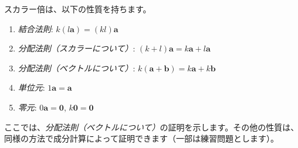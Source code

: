 \begin{thm}[スカラー倍の性質] \label{vector_scalar_property}
スカラー倍は、以下の性質を持ちます。
\begin{enumerate}
\item \emph{結合法則}: $k(l\bm{a}) = (kl)\bm{a}$
\item \emph{分配法則（スカラーについて）}: $(k+l)\bm{a} = k\bm{a} + l\bm{a}$
\item \emph{分配法則（ベクトルについて）}: $k(\bm{a}+\bm{b}) = k\bm{a} + k\bm{b}$
\item \emph{単位元}: $1\bm{a} = \bm{a}$
\item \emph{零元}: $0\bm{a} = \bm{0}$, $k\bm{0} = \bm{0}$
\end{enumerate}
\begin{proof*}
ここでは、\emph{分配法則（ベクトルについて）}の証明を示します。その他の性質は、同様の方法で成分計算によって証明できます（一部は練習問題とします）。\par

\end{proof*}
\end{thm}
